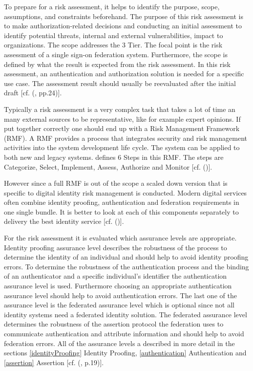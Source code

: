 To prepare for a risk assessment, it helps to identify the purpose, scope, assumptions, and constraints beforehand. The purpose of this risk assessment is to make authorization-related decisions and conducting an initial assessment to identify potential threats, internal and external vulnerabilities, impact to organizations. The scope addresses the 3 Tier. The focal point is the risk assessment of a single sign-on federation system. Furthermore, the scope is defined by what the result is expected from the risk assessment. In this risk assessment, an authentication and authorization solution is needed for a specific use case. The assessment result should usually be reevaluated after the initial draft [cf. (\cite{NIST:2012:GCRA}, pp.24)].

Typically a risk assessment is a very complex task that takes a lot of time an many external sources to be representative, like for example expert opinions. If put together correctly one should end up with a Risk Management Framework (RMF). A RMF provides a process that integrates security and risk management activities into the system development life cycle. The system can be applied to both new and legacy systems. \cite{NIST:2018:RMF} defines 6 Steps in this RMF. The steps are Categorize, Select, Implement, Assess, Authorize and Monitor [cf. (\cite{NIST:2018:RMF})]. 

However since a full RMF is out of the scope a scaled down version that is specific to digital identity risk management is conducted. Modern digital services often combine identity proofing, authentication and federation requirements in one single bundle. It is better to look at each of this components separately to delivery the best identity service [cf. (\cite{NIST:2017:DIG})]. 


For the risk assessment it is evaluated which assurance levels are appropriate. Identity proofing assurance level describes the robustness of the process to determine the identity of an individual and should help to avoid identity proofing errors. To determine the robustness of the authentication process and the binding of an authenticator and a specific individual's identifier the authentication assurance level is used. Furthermore choosing an appropriate authentication assurance level should help to avoid authentication errors. The last one of the assurance level is the federated assurance level which is optional since not all identity systems need a federated identity solution. The federated assurance level determines the robustness of the assertion protocol the federation uses to communicate authentication and attribute information and should help to avoid federation errors. All of the assurance levels a described in more detail in the sections \ref{identityProofing} Identity Proofing, \ref{authentication} Authentication and  \ref{assertion} Assertion [cf. (\cite{NIST:2017:DIG}, p.19)]. 

